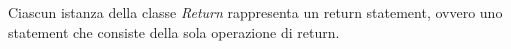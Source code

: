 
Ciascun istanza della classe \textit{Return} rappresenta un return statement, ovvero uno statement che consiste della sola operazione di return.